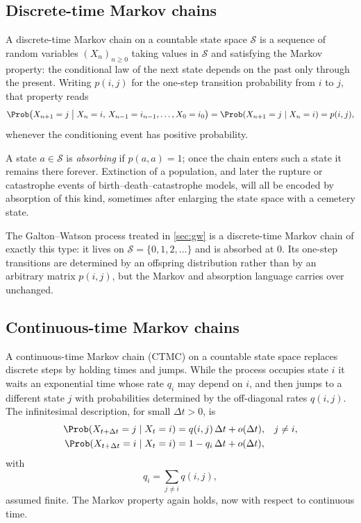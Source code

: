 \subsection{Discrete-time Markov chains}
\label{sec:dtmc}

A discrete-time Markov chain on a countable state space $\mathcal{S}$ is a sequence of random variables $(X_n)_{n\ge0}$ taking values in $\mathcal{S}$ and satisfying the Markov property: the conditional law of the next state depends on the past only through the present.  Writing $p(i,j)$ for the one-step transition probability from $i$ to $j$, that property reads
\begin{equation}
  \Prob\bigl(X_{n+1}=j \bigm| X_n=i,\, X_{n-1}=i_{n-1},\ldots,X_0=i_0\bigr)
  =\Prob(X_{n+1}=j\mid X_n=i)
  =p(i,j),
  \label{eq:dtmc-markov}
\end{equation}
whenever the conditioning event has positive probability.

A state $a\in\mathcal{S}$ is \emph{absorbing} if $p(a,a)=1$; once the chain enters such a state it remains there forever.  Extinction of a population, and later the rupture or catastrophe events of birth--death--catastrophe models, will all be encoded by absorption of this kind, sometimes after enlarging the state space with a cemetery state.

The Galton--Watson process treated in \cref{sec:gw} is a discrete-time Markov chain of exactly this type: it lives on $\mathcal{S}=\{0,1,2,\ldots\}$ and is absorbed at $0$.  Its one-step transitions are determined by an offspring distribution rather than by an arbitrary matrix $p(i,j)$, but the Markov and absorption language carries over unchanged.

\subsection{Continuous-time Markov chains}
\label{sec:ctmc}

A continuous-time Markov chain (CTMC) on a countable state space replaces discrete steps by holding times and jumps.  While the process occupies state $i$ it waits an exponential time whose rate $q_i$ may depend on $i$, and then jumps to a different state $j$ with probabilities determined by the off-diagonal rates $q(i,j)$.  The infinitesimal description, for small $\Delta t>0$, is
\begin{align}
  \Prob(X_{t+\Delta t}=j\mid X_t=i)
  &=q(i,j)\,\Delta t+o(\Delta t),
  && j\ne i,
  \label{eq:ctmc-jump}\\
  \Prob(X_{t+\Delta t}=i\mid X_t=i)
  &=1-q_i\,\Delta t+o(\Delta t),
  \label{eq:ctmc-hold}
\end{align}
with
\[
  q_i=\sum_{j\ne i}q(i,j),
\]
assumed finite.  The Markov property again holds, now with respect to continuous time.

